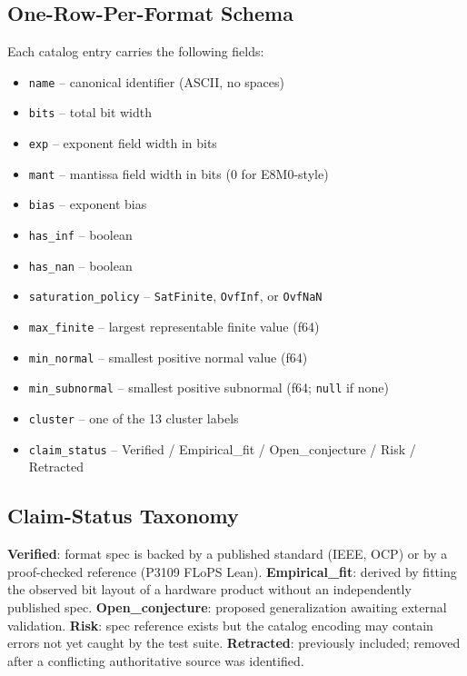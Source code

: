 \documentclass[11pt,letterpaper]{article}
\begin{document}
\subsection{One-Row-Per-Format Schema}

Each catalog entry carries the following fields:

\begin{itemize}
  \item \texttt{name} -- canonical identifier (ASCII, no spaces)
  \item \texttt{bits} -- total bit width
  \item \texttt{exp} -- exponent field width in bits
  \item \texttt{mant} -- mantissa field width in bits (0 for E8M0-style)
  \item \texttt{bias} -- exponent bias
  \item \texttt{has\_inf} -- boolean
  \item \texttt{has\_nan} -- boolean
  \item \texttt{saturation\_policy} -- \texttt{SatFinite}, \texttt{OvfInf}, or \texttt{OvfNaN}
  \item \texttt{max\_finite} -- largest representable finite value (f64)
  \item \texttt{min\_normal} -- smallest positive normal value (f64)
  \item \texttt{min\_subnormal} -- smallest positive subnormal (f64; \texttt{null} if none)
  \item \texttt{cluster} -- one of the 13 cluster labels
  \item \texttt{claim\_status} -- Verified / Empirical\_fit / Open\_conjecture / Risk / Retracted
\end{itemize}

\subsection{Claim-Status Taxonomy}

\textbf{Verified}: format spec is backed by a published standard (IEEE, OCP) or
by a proof-checked reference (P3109 FLoPS Lean).
\textbf{Empirical\_fit}: derived by fitting the observed bit layout of a hardware
product without an independently published spec.
\textbf{Open\_conjecture}: proposed generalization awaiting external validation.
\textbf{Risk}: spec reference exists but the catalog encoding may contain errors
not yet caught by the test suite.
\textbf{Retracted}: previously included; removed after a conflicting authoritative
source was identified.
\end{document}

